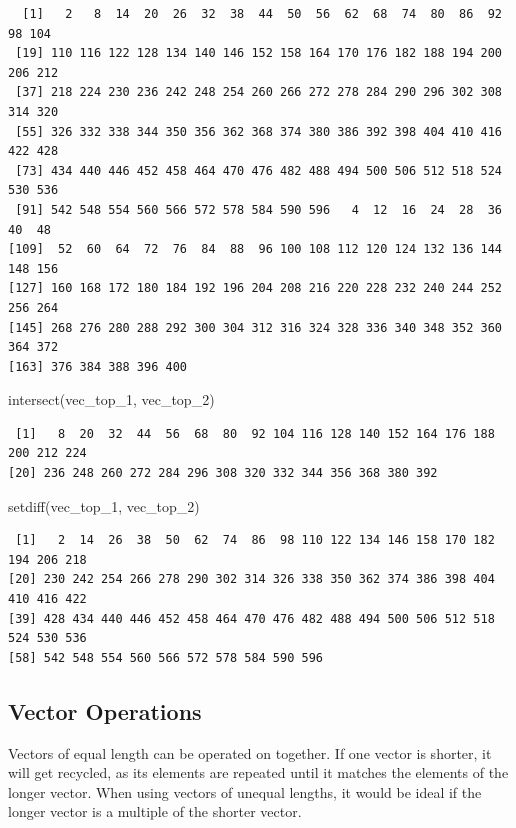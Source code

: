 \documentclass[
  letterpaper,
  DIV=11,
  numbers=noendperiod]{scrreprt}
\newenvironment{Shaded}{\begin{snugshade}}{\end{snugshade}}
\newcommand{\FunctionTok}[1]{\textcolor[rgb]{0.28,0.35,0.67}{#1}}
\newcommand{\NormalTok}[1]{\textcolor[rgb]{0.00,0.23,0.31}{#1}}
\begin{document}
\begin{verbatim}
  [1]   2   8  14  20  26  32  38  44  50  56  62  68  74  80  86  92  98 104
 [19] 110 116 122 128 134 140 146 152 158 164 170 176 182 188 194 200 206 212
 [37] 218 224 230 236 242 248 254 260 266 272 278 284 290 296 302 308 314 320
 [55] 326 332 338 344 350 356 362 368 374 380 386 392 398 404 410 416 422 428
 [73] 434 440 446 452 458 464 470 476 482 488 494 500 506 512 518 524 530 536
 [91] 542 548 554 560 566 572 578 584 590 596   4  12  16  24  28  36  40  48
[109]  52  60  64  72  76  84  88  96 100 108 112 120 124 132 136 144 148 156
[127] 160 168 172 180 184 192 196 204 208 216 220 228 232 240 244 252 256 264
[145] 268 276 280 288 292 300 304 312 316 324 328 336 340 348 352 360 364 372
[163] 376 384 388 396 400
\end{verbatim}

\begin{Shaded}
\begin{Highlighting}[]
\FunctionTok{intersect}\NormalTok{(vec\_top\_1, vec\_top\_2)}
\end{Highlighting}
\end{Shaded}

\begin{verbatim}
 [1]   8  20  32  44  56  68  80  92 104 116 128 140 152 164 176 188 200 212 224
[20] 236 248 260 272 284 296 308 320 332 344 356 368 380 392
\end{verbatim}

\begin{Shaded}
\begin{Highlighting}[]
\FunctionTok{setdiff}\NormalTok{(vec\_top\_1, vec\_top\_2)}
\end{Highlighting}
\end{Shaded}

\begin{verbatim}
 [1]   2  14  26  38  50  62  74  86  98 110 122 134 146 158 170 182 194 206 218
[20] 230 242 254 266 278 290 302 314 326 338 350 362 374 386 398 404 410 416 422
[39] 428 434 440 446 452 458 464 470 476 482 488 494 500 506 512 518 524 530 536
[58] 542 548 554 560 566 572 578 584 590 596
\end{verbatim}

\subsection{Vector Operations}\label{vector-operations}

Vectors of equal length can be operated on together. If one vector is
shorter, it will get recycled, as its elements are repeated until it
matches the elements of the longer vector. When using vectors of unequal
lengths, it would be ideal if the longer vector is a multiple of the
shorter vector.
\end{document}
